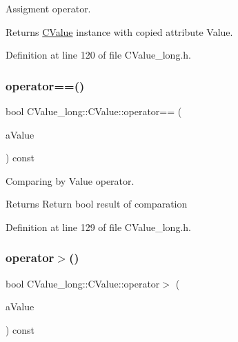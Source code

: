 Assigment operator. 

\begin{DoxyReturn}{Returns}
\hyperlink{class_c_value__long_1_1_c_value}{C\+Value} instance with copied attribute Value. 
\end{DoxyReturn}


Definition at line 120 of file C\+Value\+\_\+long.\+h.

\mbox{\label{class_c_value__long_1_1_c_value_ae1cf790d0fc1318cc6ee5b8d54e43783}} 
\subsubsection{\texorpdfstring{operator==()}{operator==()}}
{\footnotesize\ttfamily bool C\+Value\+\_\+long\+::\+C\+Value\+::operator== (\begin{DoxyParamCaption}\item[{const \hyperlink{class_c_value__long_1_1_c_value}{C\+Value} \&}]{a\+Value }\end{DoxyParamCaption}) const\hspace{0.3cm}{\ttfamily [inline]}}



Comparing by Value operator. 

\begin{DoxyReturn}{Returns}
Return {\ttfamily bool} result of comparation 
\end{DoxyReturn}


Definition at line 129 of file C\+Value\+\_\+long.\+h.

\mbox{\label{class_c_value__long_1_1_c_value_a8cbd37b49a1a9eaf0da3902f70045049}} 
\subsubsection{\texorpdfstring{operator$>$()}{operator>()}}
{\footnotesize\ttfamily bool C\+Value\+\_\+long\+::\+C\+Value\+::operator$>$ (\begin{DoxyParamCaption}\item[{const \hyperlink{class_c_value__long_1_1_c_value}{C\+Value} \&}]{a\+Value }\end{DoxyParamCaption}) const\hspace{0.3cm}{\ttfamily [inline]}}



